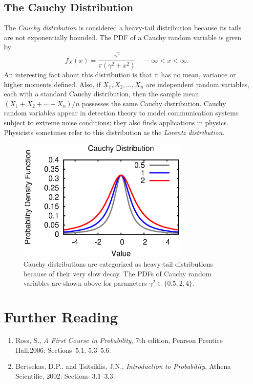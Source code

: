 \subsection{The Cauchy Distribution}
The \emph{Cauchy distribution} is considered a heavy-tail distribution because its tails are not exponentially bounded. 
The PDF of a Cauchy random variable is given by
\begin{equation*}
f_X (x) = \frac{ \gamma^2 }{\pi \left( \gamma^2 + x^2 \right)} \quad - \infty < x < \infty.
\end{equation*}
An interesting fact about this distribution is that it has no mean, variance or higher moments defined.
Also, if $X_1, X_2, \ldots, X_n$ are independent random variables, each with a standard Cauchy distribution, then the sample mean $(X_1 + X_2 + \cdots + X_n)/n$ possesses the same Cauchy distribution.
Cauchy random variables appear in detection theory to model communication systems subject to extreme noise conditions; they also finds applications in physics.
Physicists sometimes refer to this distribution as the \emph{Lorentz distribution}.

\begin{figure}[ht]
\begin{center}
\includegraphics[width=8.5cm]{Figures/8chapter/cauchy_pdf}
\end{center}
\caption{Cauchy distributions are categorized as heavy-tail distributions because of their very slow decay.
The PDFs of Cauchy random variables are shown above for parameters $\gamma^2 \in \{ 0.5, 2, 4 \}$.}
\end{figure}


\section*{Further Reading}

\begin{small}
\begin{enumerate}
\item Ross, S., \emph{A First Course in Probability}, 7th edition, Pearson Prentice Hall,2006: Sections~5.1, 5.3--5.6.
\item Bertsekas, D.P., and Tsitsiklis, J.N., \emph{Introduction to Probability}, Athena Scientific, 2002: Sections~3.1--3.3.
\end{enumerate}
\end{small}

